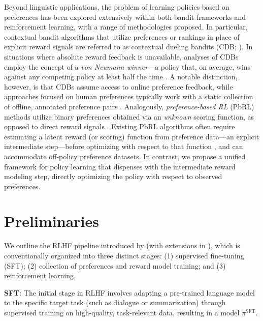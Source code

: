 Beyond linguistic applications, the problem of learning policies based on preferences has been explored extensively within both bandit frameworks and reinforcement learning, with a range of methodologies proposed. In particular, contextual bandit algorithms that utilize preferences or rankings in place of explicit reward signals are referred to as contextual dueling bandits (CDB; \cite{yue2012karmed,dudik2015contextual}). In situations where absolute reward feedback is unavailable, analyses of CDBs employ the concept of a \textit{von Neumann winner}—a policy that, on average, wins against any competing policy at least half the time \citep{dudik2015contextual}. A notable distinction, however, is that CDBs assume access to online preference feedback, while approaches focused on human preferences typically work with a static collection of offline, annotated preference pairs \citep{yan2022human}. Analogously, \textit{preference-based RL} (PbRL) methods utilize binary preferences obtained via an \textit{unknown} scoring function, as opposed to direct reward signals \citep{BusaFekete2014,ruiz2023dueling}. Existing PbRL algorithms often require estimating a latent reward (or scoring) function from preference data—an explicit intermediate step—before optimizing with respect to that function \citep{jain2013learning,BusaFekete2014,christiano2017deep,sadigh2017active,kupcsik2018learning}, and can accommodate off-policy preference datasets. In contrast, we propose a unified framework for policy learning that dispenses with the intermediate reward modeling step, directly optimizing the policy with respect to observed preferences.

\section{Preliminaries}\label{section:prelims}

We outline the RLHF pipeline introduced by \citeauthor{ziegler2020finetuning} (with extensions in \citep{stiennon2022learning, bai2022training, ouyang2022training}), which is conventionally organized into three distinct stages: (1) supervised fine-tuning (SFT); (2) collection of preferences and reward model training; and (3) reinforcement learning.

\textbf{SFT}: The initial stage in RLHF involves adapting a pre-trained language model to the specific target task (such as dialogue or summarization) through supervised training on high-quality, task-relevant data, resulting in a model $\pi^\text{SFT}$.

